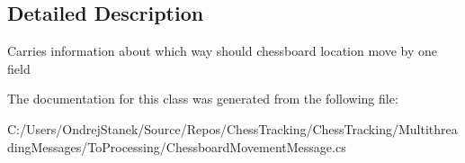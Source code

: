 \subsection{Detailed Description}
Carries information about which way should chessboard location move by one field 



The documentation for this class was generated from the following file\+:\begin{DoxyCompactItemize}
\item 
C\+:/\+Users/\+Ondrej\+Stanek/\+Source/\+Repos/\+Chess\+Tracking/\+Chess\+Tracking/\+Multithreading\+Messages/\+To\+Processing/Chessboard\+Movement\+Message.\+cs\end{DoxyCompactItemize}
